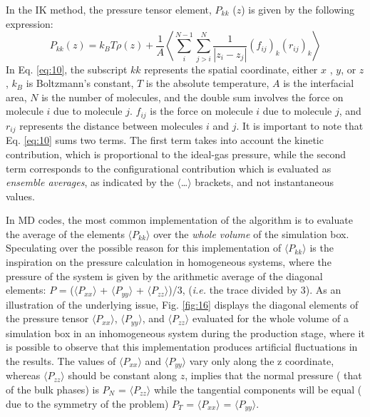\documentclass[9pt,tutorial]{livecoms}
\begin{document}
In the IK method, the pressure tensor element, $P_{kk}$ ($z$) is given by the following expression:
\begin{equation}
P_{kk}\left(z\right)=k_{B}T\rho\left(z\right)+\frac{1}{A}\left\langle \sum_{{\scriptstyle i}}^{{\scriptstyle N-1}}\sum_{{\scriptstyle j>i}}^{N}\frac{1}{\left|z_{i}-z_{j}\right|}\left(f_{ij}\right)_{k}\left(r_{ij}\right)_{k}\right\rangle 
  \label{eq:10}
\end{equation}
In Eq. \ref{eq:10}, the subscript $kk$ represents the spatial coordinate, either
$x$ , $y$, or $z$ , $k_{B}$ is Boltzmann's
constant, $T$ is the absolute temperature, $A$ is the interfacial
area, $N$ is the number of molecules, and the double sum involves the
force on molecule $i$ due to molecule $j$. $f_{ij}$ is
the force on molecule $i$ due to molecule $j$, and
$r_{ij}$ represents the distance between molecules $i$ and
$j$. It is important to note that Eq. \ref{eq:10} sums two terms.
The first term takes into account the kinetic contribution, which is
proportional to the ideal-gas pressure, while the second term corresponds to
the configurational contribution which is evaluated as \textit{ensemble averages}, as
indicated by the ${\langle}${\ldots}${\rangle}$ brackets, and not instantaneous
values.

In MD codes, the most common implementation of the algorithm is to evaluate the
average of the elements ${\langle}P_{kk}{\rangle}$ over the \textit{whole
volume} of the simulation box. Speculating over the possible reason for this
implementation of ${\langle}P_{kk}{\rangle}$ is the inspiration on
the pressure calculation in homogeneous systems, where the pressure of the
system is given by the arithmetic average of the diagonal elements: $P$
= (${\langle}P_{xx}{\rangle}$
+ ${\langle}P_{yy}{\rangle}$
+ ${\langle}P_{zz}{\rangle}$)/3, (\textit{i.e.} the trace divided by 3). As an illustration of the
underlying issue, Fig. \ref{fig:16} displays the diagonal elements of the pressure
tensor ${\langle}P_{xx}{\rangle}$,
${\langle}P_{yy}{\rangle}$, and
${\langle}P_{zz}{\rangle}$ evaluated for the whole volume of
a simulation box in an inhomogeneous system during the production stage, where
it is possible to observe that this implementation produces artificial
fluctuations in the results.  The values of
${\langle}P_{xx}{\rangle}$ and
${\langle}P_{yy}{\rangle}$ vary only along the z coordinate,
whereas ${\langle}P_{zz}{\rangle}$ should be constant along
$z$,  implies that the normal pressure ( that of the bulk phases) is
$P_{N}$ = ${\langle}P_{zz}{\rangle}$ while the tangential
components will be equal ( due to the symmetry of the problem)
$P_{T}$ = ${\langle}P_{xx}{\rangle}$
= ${\langle}P_{yy}{\rangle}$. 
\end{document}
